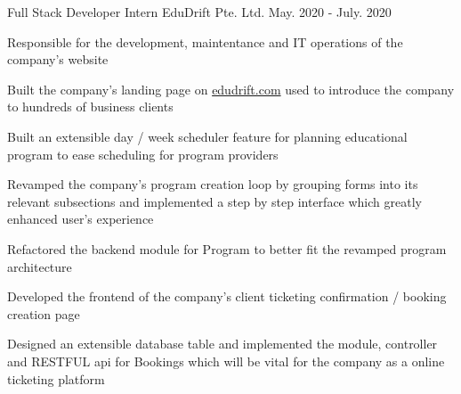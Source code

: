 

\begin{cventries}

  \cventry
    {Full Stack Developer Intern} %
    {EduDrift Pte. Ltd.} %
    {} %
    {May. 2020 - July. 2020} %
    {
      \begin{cvitems} %
        \item {Responsible for the development, maintentance and IT operations of the company's website}
        \item {Built the company's landing page on \textcolor{eduDft-darkblue}{\href{https://edudrift.com}{edudrift.com}} used to introduce the company to hundreds of business clients}
        \item {Built an extensible day / week scheduler feature for planning educational program to ease scheduling for program providers}
        \item {Revamped the company's program creation loop by grouping forms into its relevant subsections and implemented a step by step interface which greatly enhanced user's experience}
        \item {Refactored the backend module for Program to better fit the revamped program architecture}
        \item {Developed the frontend of the company's client \textcolor{eduDft-darkblue}{ticketing confirmation / booking creation page}}
        \item{Designed an extensible database table and implemented the module, controller and RESTFUL api for Bookings which will be vital for the company as a online ticketing platform}
      \end{cvitems}
    }

\end{cventries}

